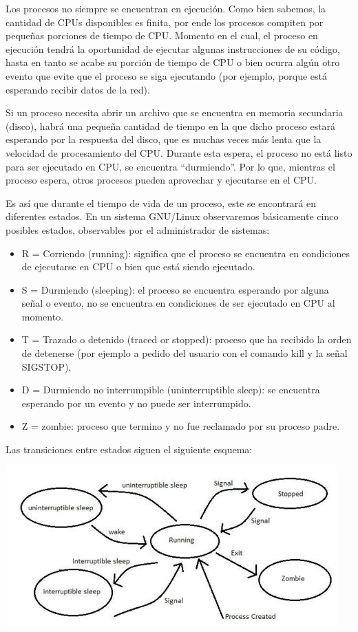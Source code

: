 \documentclass[12pt]{article}
\begin{document}
Los procesos no siempre se encuentran en ejecución. 
Como bien sabemos, la cantidad de CPUs disponibles es finita, por ende 
los procesos compiten por 
pequeñas porciones de tiempo de CPU. Momento en el cual, el proceso en 
ejecución tendrá la oportunidad de ejecutar algunas instrucciones de su 
código, hasta en tanto se acabe su porción de tiempo de CPU o bien ocurra 
algún otro evento que evite que el proceso se siga ejecutando (por ejemplo, 
porque está esperando recibir datos de la red). 

Si un proceso necesita abrir un archivo que se encuentra en 
memoria secundaria (disco), habrá una pequeña cantidad de tiempo en la que 
dicho proceso estará esperando por la respuesta del disco, que es muchas 
veces más lenta que la velocidad de procesamiento del CPU. Durante esta
espera, el proceso no está listo para ser ejecutado en CPU, se encuentra 
``durmiendo''. Por lo que, mientras el proceso espera, otros procesos 
pueden aprovechar y ejecutarse en el CPU. 
  
Es así que durante el tiempo de vida de un proceso, este se encontrará en 
diferentes estados. En un sistema GNU/Linux observaremos básicamente 
cinco posibles estados, observables por el administrador de sistemas: 

\begin{itemize}
\item R = Corriendo (running): significa que el proceso se encuentra en 
condiciones de ejecutarse en CPU o bien que está siendo ejecutado.  
\item S = Durmiendo (sleeping): el proceso se encuentra esperando por 
alguna señal o evento, no se encuentra en condiciones de ser ejecutado en 
CPU al momento. 
\item T = Trazado o detenido (traced or stopped): proceso que ha recibido 
la orden de detenerse (por ejemplo a pedido del usuario con el comando 
kill y la señal SIGSTOP). 
\item D = Durmiendo no interrumpible (uninterruptible sleep): se encuentra
esperando por un evento y no puede ser interrumpido. 
\item Z = zombie: proceso que termino y no fue reclamado por su proceso 
padre. 
\end{itemize}

Las transiciones entre estados siguen el siguiente esquema: 

\begin{center}
\includegraphics{process-states-s.jpg}
\end{center}
 
\end{document}
